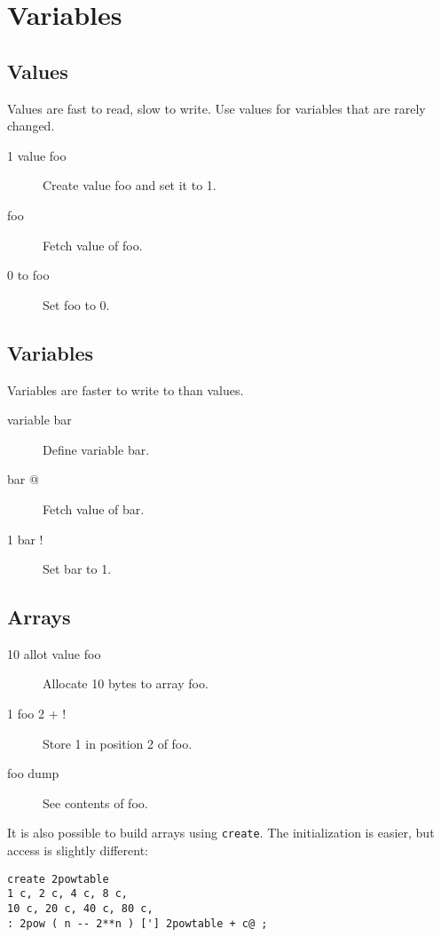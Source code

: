\section{Variables}

\subsection{Values}

Values are fast to read, slow to write. Use values for variables
that are rarely changed. 

\begin{description}
\item[1 value foo] Create value foo and set it to 1.
\item[foo] Fetch value of foo.
\item[0 to foo] Set foo to 0.
\end{description}

\subsection{Variables}

Variables are faster to write to than values.

\begin{description}
\item[variable bar] Define variable bar.
\item[bar @] Fetch value of bar.
\item[1 bar !] Set bar to 1.
\end{description}

\subsection{Arrays}

\begin{description}
\item[10 allot value foo] Allocate 10 bytes to array foo.
\item[1 foo 2 + !] Store 1 in position 2 of foo.
\item[foo dump] See contents of foo.
\end{description}

It is also possible to build arrays using \texttt{create}. The initialization is easier, but access is slightly different:

\begin{verbatim}
create 2powtable
1 c, 2 c, 4 c, 8 c,
10 c, 20 c, 40 c, 80 c,
: 2pow ( n -- 2**n ) ['] 2powtable + c@ ;
\end{verbatim}

